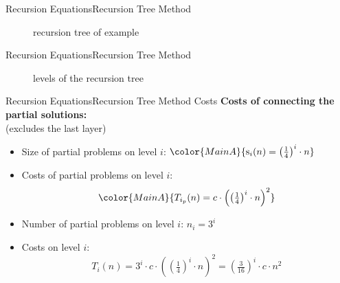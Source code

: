 
\begin{frame}{Recursion Equations}{Recursion Tree Method}
  \begin{figure}
    \begin{adjustbox}{width=\linewidth}
      
    \end{adjustbox}
    \caption{recursion tree of example}
    \label{fig:recursion_equations:example_recursion_tree}
  \end{figure}
\end{frame}


\begin{frame}{Recursion Equations}{Recursion Tree Method}
  \begin{figure}
    \begin{adjustbox}{width=\linewidth}
      
    \end{adjustbox}
    \caption{levels of the recursion tree}
    \label{fig:recursion_equations:example_recursion_tree_layer}
  \end{figure}
\end{frame}

\begin{frame}{Recursion Equations}{Recursion Tree Method Costs}
  \textbf{Costs of connecting the partial solutions:}\\
  \hspace{1.5em}(excludes the last layer)
  \begin{itemize}
    \item<2->
      Size of partial problems on {\color{MainA}level $i$}:
      \begin{math}
        \color{MainA}{
          \mathrm{s}_i(n) = \left(\frac{1}{4}\right)^i \cdot n
        }
      \end{math}
    \item<3->
      Costs of partial problems on {\color{MainA}level $i$}:
      \begin{displaymath}
        \color{MainA}{
          T_{i_p}(n) =
          c \cdot \left(\left(\tfrac{1}{4}\right)^i \cdot n\right)^2
        }
      \end{displaymath}
    \item<4->
      Number of partial problems on {\color{MainA}level $i$}:
      {\color{MainA}$n_{i} = 3^{i}$}
    \item<5->
      Costs on {\color{MainA}level $i$}:
        \color{MainA}
      \begin{displaymath}
        T_i(n) = 3^{i} \cdot c \cdot \left(
          \left(\tfrac{1}{4}\right)^{i} \cdot n
        \right)^2
        = \left(\tfrac{3}{16}\right)^{i} \cdot c \cdot n^2
      \end{displaymath}
        \color{black}
  \end{itemize}
\end{frame}

